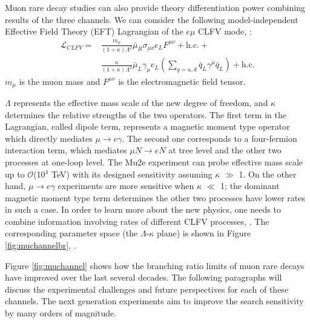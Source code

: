 Muon rare decay studies can also provide theory differentiation power 
combining results of the three channels. We can consider the following model-independent 
Effective Field Theory (EFT) Lagrangian of the $e \mu$ CLFV mode, \cite{doi:10.1146/annurev-nucl-100809-131949}:
\begin{equation}\label{LCF}
\begin{aligned}
\mathscr{L}_{C L F V}= & \frac{m_\mu}{(1+\kappa) \Lambda^2} \bar{\mu}_R \sigma_{\mu \nu} e_L F^{\mu \nu}+\text{h.c.}+ \\
&\frac{\kappa}{(1+\kappa) \Lambda^2} \bar{\mu}_L \gamma_\mu e_L\left(\sum_{q=u, d} \bar{q}_L \gamma^\mu \bar{q}_L\right)+\text{h.c.}
\end{aligned}
\end{equation}
$m_\mu$ is the muon mass and  $F^{\mu \nu}$ is the electromagnetic field tensor.

$\Lambda$ represents the effective mass scale of the new degree of freedom, and $\kappa$
determines the relative strengths of the two operators. The first term in the Lagrangian,
called  dipole term, represents a
magnetic moment type operator which directly mediates $\mu \rightarrow e \gamma$. 
The second one corresponds to a four-fermion interaction term, 
which mediates $\mu N \rightarrow eN$ at  tree level and 
the other two processes at one-loop level.
The Mu2e experiment can probe  effective mass scale up 
to $\mathcal{O}$(10$^4$ TeV) with its designed sensitivity assuming $\kappa$ $\gg$ 1.
On the other hand, $\mu \rightarrow e\gamma$  experiments 
are more sensitive when $\kappa$ $\ll$ 1; the dominant magnetic
moment type term determines the other two processes have 
lower rates in such a case. In order to learn more about the new
physics, one needs to combine information involving rates 
of different CLFV processes, \cite{osti_1042577}.
The corresponding parameter space (the $\Lambda$-$\kappa$ plane) is shown in 
Figure \ref{fig:muchannelbr}, \cite{doi:10.1146/annurev-nucl-100809-131949}. 

Figure \ref{fig:muchannel} 
shows how the branching ratio limits of muon rare decays
have  improved over the last several decades. The following paragraphs 
will discuss the experimental challenges and future perspectives 
for each of these channels. The next generation 
experiments aim to improve the search sensitivity by many orders of magnitude. 

